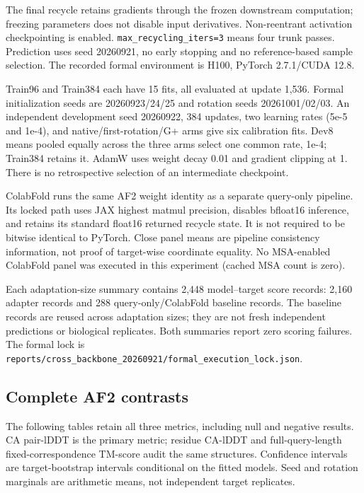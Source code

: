 The final recycle retains gradients through the frozen downstream computation;
freezing parameters does not disable input derivatives. Non-reentrant activation
checkpointing is enabled. \nolinkurl{max_recycling_iters=3} means four trunk passes.
Prediction uses seed 20260921, no early stopping and no reference-based sample
selection. The recorded formal environment is H100, PyTorch 2.7.1/CUDA 12.8.

Train96 and Train384 each have 15 fits, all evaluated at update 1,536. Formal
initialization seeds are 20260923/24/25 and rotation seeds 20261001/02/03.
An independent development seed 20260922, 384 updates, two learning rates
(5e-5 and 1e-4), and native/first-rotation/G+ arms give six calibration fits.
Dev8 means pooled equally across the three arms select one common rate, 1e-4;
Train384 retains it. AdamW uses weight decay 0.01 and gradient clipping at 1.
There is no retrospective selection of an intermediate checkpoint.

ColabFold runs the same AF2 weight identity as a separate query-only pipeline.
Its locked path uses JAX highest matmul precision, disables bfloat16 inference,
and retains its standard float16 returned recycle state. It is not required to
be bitwise identical to PyTorch. Close panel means are pipeline consistency
information, not proof of target-wise coordinate equality. No MSA-enabled
ColabFold panel was executed in this experiment (cached MSA count is zero).

Each adaptation-size summary contains 2,448 model--target score records:
2,160 adapter records and 288 query-only/ColabFold baseline records. The baseline
records are reused across adaptation sizes; they are not fresh independent
predictions or biological replicates. Both summaries report zero scoring failures.
The formal lock is \nolinkurl{reports/cross_backbone_20260921/formal_execution_lock.json}.

\subsection{Complete AF2 contrasts}\label{complete-af2-contrasts}

The following tables retain all three metrics, including null and negative
results. CA pair-lDDT is the primary metric; residue CA-lDDT and full-query-length
fixed-correspondence TM-score audit the same structures. Confidence intervals
are target-bootstrap intervals conditional on the fitted models. Seed and
rotation marginals are arithmetic means, not independent target replicates.

